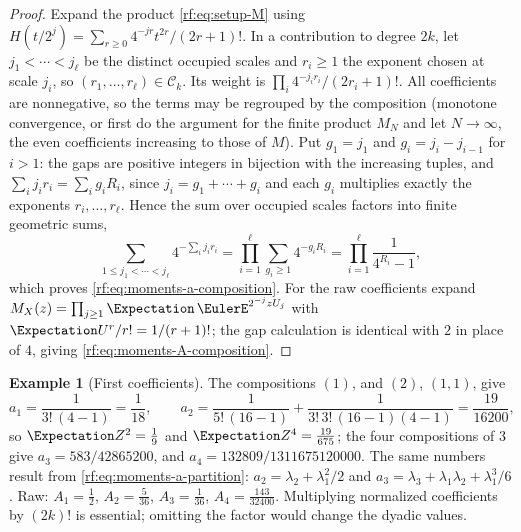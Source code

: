 \documentclass[11pt,oneside]{article}
\theoremstyle{plain}
\theoremstyle{definition}
\newtheorem{example}[theorem]{Example}
\theoremstyle{remark}
\newcommand{\E}{\Expectation}
\newcommand{\Comp}[1]{\mathcal{C}_{#1}}     %
\begin{document}
\begin{proof}
Expand the product \cref{rf:eq:setup-M} using
$H(t/2^{j})=\sum_{r\ge0}4^{-jr}t^{2r}/(2r+1)!$.  In a contribution to degree
$2k$, let $j_{1}<\cdots<j_{\ell}$ be the distinct occupied scales and
$r_{i}\ge1$ the exponent chosen at scale $j_{i}$, so
$(r_{1},\ldots,r_{\ell})\in\Comp{k}$.  Its weight is
$\prod_{i}4^{-j_{i}r_{i}}/(2r_{i}+1)!$.  All coefficients are nonnegative,
so the terms may be regrouped by the composition (monotone convergence, or
first do the argument for the finite product $M_{N}$ and let $N\to\infty$,
the even coefficients increasing to those of $M$).  Put $g_{1}=j_{1}$ and
$g_{i}=j_{i}-j_{i-1}$ for $i>1$: the gaps are positive integers in bijection
with the increasing tuples, and $\sum_{i}j_{i}r_{i}=\sum_{i}g_{i}R_{i}$,
since $j_{i}=g_{1}+\cdots+g_{i}$ and each $g_{i}$ multiplies exactly the
exponents $r_{i},\ldots,r_{\ell}$.  Hence the sum over occupied scales
factors into finite geometric sums,
\begin{equation}
 \sum_{1\le j_{1}<\cdots<j_{\ell}}4^{-\sum_{i}j_{i}r_{i}}
 =\prod_{i=1}^{\ell}\sum_{g_{i}\ge1}4^{-g_{i}R_{i}}
 =\prod_{i=1}^{\ell}\frac{1}{4^{R_{i}}-1},
 \label{rf:eq:moments-gaps}
\end{equation}
which proves \cref{rf:eq:moments-a-composition}.  For the raw coefficients
expand $M_{X}(z)=\prod_{j\ge1}\E\,\EulerE^{2^{-j}zU_{j}}$ with
$\E U^{r}/r!=1/(r+1)!$; the gap calculation is identical with $2$ in place
of $4$, giving \cref{rf:eq:moments-A-composition}.
\end{proof}

\begin{example}[First coefficients]
\label{rf:ex:moments-first}
The compositions $(1)$, and $(2)$, $(1,1)$, give
\[
 a_{1}=\frac{1}{3!\,(4-1)}=\frac{1}{18},\qquad
 a_{2}=\frac{1}{5!\,(16-1)}+\frac{1}{3!\,3!\,(16-1)(4-1)}=\frac{19}{16200},
\]
so $\E Z^{2}=\tfrac19$ and $\E Z^{4}=\tfrac{19}{675}$; the four
compositions of $3$ give $a_{3}=583/42865200$, and $a_{4}=132809/1311675120000$.
The same numbers result from \cref{rf:eq:moments-a-partition}:
$a_{2}=\lambda_{2}+\lambda_{1}^{2}/2$ and
$a_{3}=\lambda_{3}+\lambda_{1}\lambda_{2}+\lambda_{1}^{3}/6$.  Raw:
$A_{1}=\tfrac12$, $A_{2}=\tfrac5{36}$, $A_{3}=\tfrac1{36}$,
$A_{4}=\tfrac{143}{32400}$.  Multiplying normalized coefficients by
$(2k)!$ is essential; omitting the factor would change the dyadic values.
\end{example}
\end{document}
